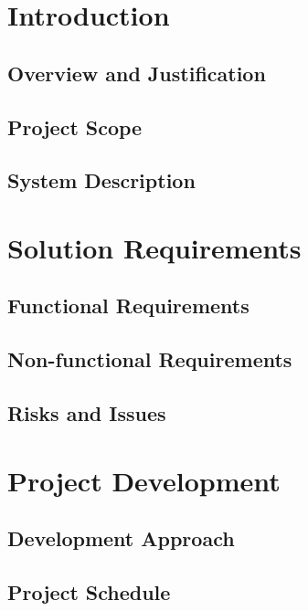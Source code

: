 \documentclass[coverpage]{../custom}
\begin{document}
\maketitle

\section{Introduction}
\subsection{Overview and Justification}
\subsection{Project Scope}
\subsection{System Description}
\section{Solution Requirements}
\subsection{Functional Requirements}
\subsection{Non-functional Requirements}
\subsection{Risks and Issues}
\section{Project Development}
\subsection{Development Approach}
\subsection{Project Schedule}
\end{document}
